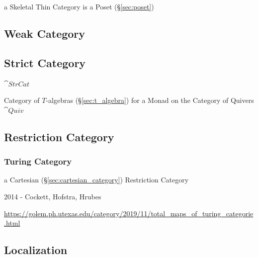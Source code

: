 a Skeletal Thin Category is a Poset (\S\ref{sec:poset})



\subsection{Weak Category}\label{sec:weak_category}

\subsection{Strict Category}\label{sec:strict_category}

$\cat{StrCat}$

Category of $T$-algebras (\S\ref{sec:t_algebra}) for a Monad on the
Category of Quivers $\cat{Quiv}$



\subsection{Restriction Category}\label{sec:restriction_category}

\subsubsection{Turing Category}\label{sec:turing_category}

a Cartesian (\S\ref{sec:cartesian_category}) Restriction Category

2014 - Cockett, Hofstra, Hrubes

\url{https://golem.ph.utexas.edu/category/2019/11/total_maps_of_turing_categorie.html}



\subsection{Localization}\label{sec:category_localization}

